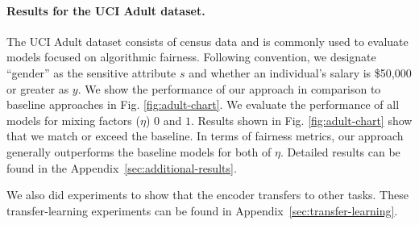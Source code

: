 \paragraph{Results for the UCI Adult dataset.}
The UCI Adult dataset consists of census data and is commonly used to evaluate models focused on algorithmic fairness.
Following convention, we designate ``gender'' as the sensitive attribute $s$ and whether an individual's salary is \$50,000 or greater as $y$.
We show the performance of our approach in comparison to baseline approaches in Fig. \ref{fig:adult-chart}.
We evaluate the performance of all models for mixing factors ($\eta$) $0$ and $1$. 
Results shown in Fig. \ref{fig:adult-chart} show that
we match or exceed the baseline.
In terms of fairness metrics, our approach generally outperforms the baseline models for both of $\eta$.
Detailed results can be found in the Appendix~\ref{sec:additional-results}.

We also did experiments to show that the encoder transfers to other tasks. These transfer-learning experiments can be found in Appendix~\ref{sec:transfer-learning}.


